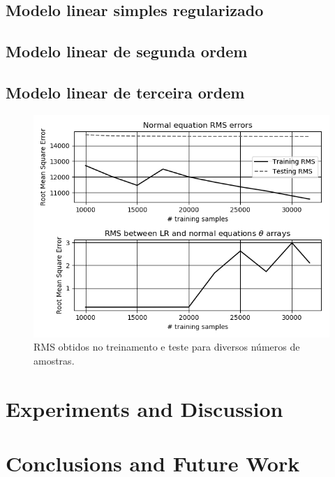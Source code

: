 \documentclass[10pt,twocolumn,letterpaper]{article}
\begin{document}
\subsection{Modelo linear simples regularizado}

\subsection{Modelo linear de segunda ordem}

\subsection{Modelo linear de terceira ordem}

\begin{figure}
    \centering
    \includegraphics[width=0.9\columnwidth]{img/lr-norm.png}
    \caption{RMS obtidos no treinamento e teste para diversos números de amostras.}
    \label{fig:lr-norm}
\end{figure}

\section{Experiments and Discussion}

\section{Conclusions and Future Work}

{\small


}
\end{document}
